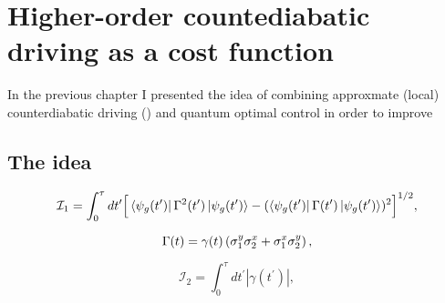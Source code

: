 \chapter{Higher-order countediabatic driving as a cost function}

In the previous chapter I presented the idea of combining approxmate (local) counterdiabatic driving () and quantum optimal control in order to improve 

\section{The idea}

\begin{equation}\label{eq:AGP_integral_1}
\mathcal{I}_1 = \int_0^\tau dt^\prime \Big[\bra{\psi_g(t^\prime)} \Gamma^2(t^\prime) \ket{\psi_g(t^\prime)}  - (\bra{\psi_g(t^\prime)} \Gamma(t^\prime) \ket{\psi_g(t^\prime)})^2\Big]^{1/2},
\end{equation}

\begin{equation}\label{eq:Gamma_def}
\Gamma(t) = \gamma(t) \left( \sigma^y_1 \sigma^x_2 + \sigma^x_1 \sigma^y_2 \right),
\end{equation}

\begin{equation}\label{eq:AGP_integral_2}
\mathcal{I}_2 = \int_0^\tau dt^\prime |\gamma(t^\prime)|,
\end{equation}